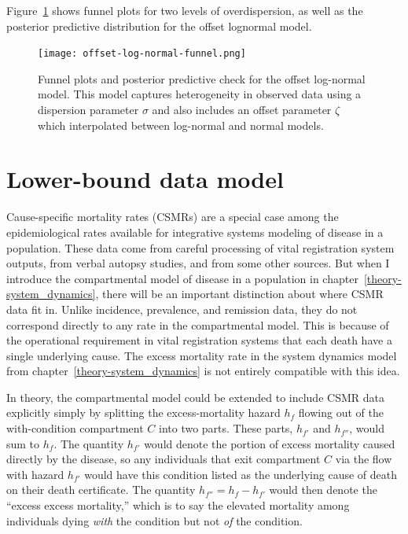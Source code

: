 Figure~\ref{rate-model-offset-log-normal-funnel} shows funnel plots for two levels of overdispersion, as well as the posterior predictive distribution for the offset lognormal model.

\begin{figure}[h!]
\begin{center}
\texttt{[image: offset-log-normal-funnel.png]}
\end{center}
\caption[Funnel plots and posterior predictive check for the offset
  log-normal model.]{Funnel plots and posterior predictive check for
  the offset log-normal model. This model captures heterogeneity in
  observed data using a dispersion parameter $\sigma$ and also
  includes an offset parameter $\zeta$ which interpolated between
  log-normal and normal
  models.} \label{rate-model-offset-log-normal-funnel}
\end{figure}

\section{Lower-bound data model}
\label{theory-csmr}
Cause-specific mortality rates (CSMRs) are a special case among the
epidemiological rates available for integrative systems modeling of
disease in a population.  These data come from careful processing of
vital registration system outputs, from verbal autopsy studies, and
from some other sources. But when I introduce the compartmental model
of disease in a population in chapter~\ref{theory-system_dynamics},
there will be an important distinction about where CSMR data fit in.
Unlike incidence, prevalence, and remission data, they do not
correspond directly to any rate in the compartmental model.  This is
because of the operational requirement in vital registration systems
that each death have a single underlying cause.  The excess mortality
rate in the system dynamics model from
chapter~\ref{theory-system_dynamics} is not entirely compatible with
this idea.

In theory, the compartmental model could be extended to include CSMR
data explicitly simply by splitting the excess-mortality hazard $h_f$ flowing out
of the with-condition compartment $C$ into two parts.  These parts,
$h_{f'}$ and $h_{f''}$, would sum to $h_f$. The quantity $h_{f'}$ would denote the portion of
excess mortality caused directly by the disease, so any individuals
that exit compartment $C$ via the flow with hazard $h_{f'}$ would have this condition
listed as the underlying cause of death on their death certificate.
The quantity $h_{f''} = h_{f} - h_{f'}$ would then denote the ``excess excess mortality,''
which is to say the elevated mortality among individuals dying
\emph{with} the condition but not \emph{of} the condition.

